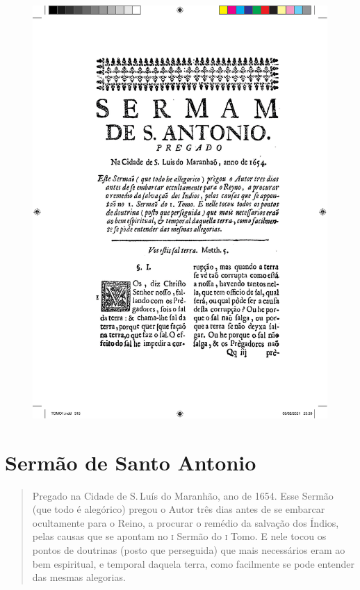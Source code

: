 \pagebreak
\thispagestyle{empty}
\movetoevenpage
\begin{figure}
\includegraphics[width=\textwidth]{./imgs/stantonio.pdf}  
\end{figure}

\chapter{Sermão de Santo Antonio}

\begin{quotation}
\noindent{}Pregado na Cidade de S.\,Luís do Maranhão, ano de 1654.
Esse Sermão (que todo é alegórico) pregou o Autor três dias antes de se embarcar
ocultamente para o Reino, a procurar o remédio da salvação dos Índios, pelas
causas que se apontam no \textsc{i} Sermão do \textsc{i} Tomo. E nele
tocou os pontos de doutrinas (posto que perseguida) que mais necessários eram ao bem espiritual, e temporal daquela terra, como facilmente se pode entender das mesmas alegorias.
\end{quotation}

